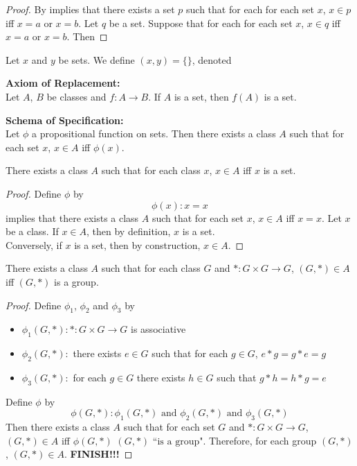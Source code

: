 \documentclass{book}
\begin{document}
	\begin{proof}
		By  implies that there exists a set $p$ such that for each for each set $x$, $x \in p$ iff $x = a$ or $x = b$. Let $q$ be a set. Suppose that for each for each set $x$, $x \in q$ iff $x = a$ or $x = b$. Then  
	\end{proof}

	\begin{defn}
		Let $x$ and $y$ be sets. We define $(x,y) = \{\}$, denoted 
	\end{defn}
	
	\begin{ax}  \textbf{Axiom of Replacement:}  \\
		Let $A$, $B$ be classes and $f:A \rightarrow B$. If $A$ is a set, then $f(A)$ is a set. 
	\end{ax}

	\begin{ax}  \textbf{Schema of Specification:}  \\
		Let $\phi$ a propositional function on sets. Then there exists a class $A$ such that for each set $x$, $x \in A$ iff $\phi(x)$. 
	\end{ax}
	
	\begin{ex} 
		There exists a class $A$ such that for each class $x$, $x \in A$ iff $x$ is a set.
	\end{ex}
	
	\begin{proof}
		Define $\phi$ by $$\phi(x) : x = x$$ 
		 implies that there exists a class $A$ such that for each set $x$, $x \in A$ iff $x = x$. Let $x$ be a class. If $x \in A$, then by definition, $x$ is a set. \\
		Conversely, if $x$ is a set, then by construction, $x \in A$.
	\end{proof}
	
	\begin{ex} 
		There exists a class $A$ such that for each class $G$ and $*: G \times G \rightarrow G$, $(G, *) \in A$ iff $(G, *)$ is a group.
	\end{ex}
	
	\begin{proof}
		Define $\phi_1$, $\phi_2$ and $\phi_3$ by 
		\begin{itemize}
			\item $\phi_1(G, *): *:G \times G \rightarrow G$ is associative
			\item $\phi_2(G, *):$ there exists $e \in G$ such that for each $g \in G$, $e * g = g * e = g$
			\item $\phi_3(G, *):$ for each $g \in G$ there exists $h \in G$ such that $g * h = h * g = e$
		\end{itemize}
		Define $\phi$ by 
		$$\phi(G, *) : \phi_1(G, *) \text{ and } \phi_2(G, *) \text{ and } \phi_3(G, *)$$
		Then there exists a class $A$ such that for each set $G$ and  $*: G \times G \rightarrow G$, $(G, *) \in A$ iff $\phi(G, *)$ $(G, *) \text{ ``is a group"}$. Therefore, for each group $(G, *)$, $(G, *) \in A$.
		\textbf{FINISH!!!}
	\end{proof}
	
\end{document}

